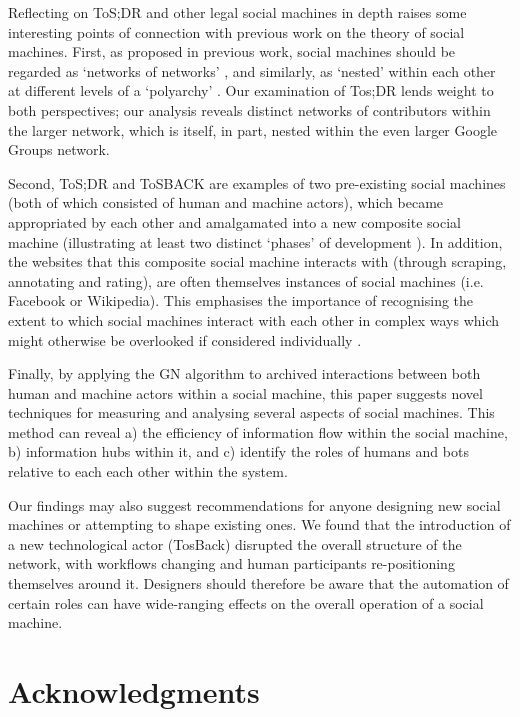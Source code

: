 \documentclass{sig-alternate}
\begin{document}
Reflecting on ToS;DR and other legal social machines in depth raises some interesting points of connection with previous work on the theory of social machines. First, as proposed in previous work, social machines should be regarded as `networks of networks' \cite{tinati:htp}, and similarly, as `nested' within each other at different levels of a `polyarchy' \cite{shadbolt:classif}. Our examination of Tos;DR lends weight to both perspectives; our analysis reveals distinct networks of contributors within the larger network, which is itself, in part, nested within the even larger Google Groups network.

Second, ToS;DR and ToSBACK are examples of two pre-existing social machines (both of which consisted of human and machine actors), which became appropriated by each other and amalgamated into a new composite social machine (illustrating at least two distinct `phases' of development \cite{tinati:htp}). In addition, the websites that this composite social machine interacts with (through scraping, annotating and rating), are often themselves instances of social machines (i.e. Facebook or Wikipedia). This emphasises the importance of recognising the extent to which social machines interact with each other in complex ways which might otherwise be overlooked if considered individually \cite{deroure:obs}.

Finally, by applying the GN algorithm to archived interactions between both human and machine actors within a social machine, this paper suggests novel techniques for measuring and analysing several aspects of social machines. This method can reveal a) the efficiency of information flow within the social machine, b) information hubs within it, and c) identify the roles of humans and bots relative to each each other within the system.

Our findings may also suggest recommendations for anyone designing new social machines or attempting to shape existing ones. We found that the introduction of a new technological actor (TosBack) disrupted the overall structure of the network, with workflows changing and human participants re-positioning themselves around it. Designers should therefore be aware that the automation of certain roles can have wide-ranging effects on the overall operation of a social machine.

\section{Acknowledgments}
\end{document}
